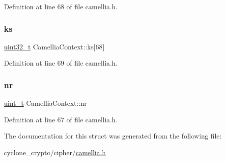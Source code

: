 Definition at line 68 of file camellia.\+h.

\mbox{\label{structCamelliaContext_a462c7479aab6b5e6a3646ab1b0eb6f6c}} 
\subsubsection{\texorpdfstring{ks}{ks}}
{\footnotesize\ttfamily \hyperlink{stdint_8h_a435d1572bf3f880d55459d9805097f62}{uint32\+\_\+t} Camellia\+Context\+::ks\mbox{[}68\mbox{]}}



Definition at line 69 of file camellia.\+h.

\mbox{\label{structCamelliaContext_a53fbc3b3b523fcf86ec2fb13690c4c5e}} 
\subsubsection{\texorpdfstring{nr}{nr}}
{\footnotesize\ttfamily \hyperlink{compiler__port_8h_a12a1e9b3ce141648783a82445d02b58d}{uint\+\_\+t} Camellia\+Context\+::nr}



Definition at line 67 of file camellia.\+h.



The documentation for this struct was generated from the following file\+:\begin{DoxyCompactItemize}
\item 
cyclone\+\_\+crypto/cipher/\hyperlink{camellia_8h}{camellia.\+h}\end{DoxyCompactItemize}
